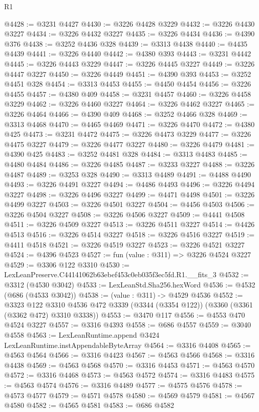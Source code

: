 \begin{lexlean}{R1}
\begin{coremodule}
@4428 := @3231 @4427
@4430 := @3226 @4428 @3229
@4432 := @3226 @4430 @3227
@4434 := @3226 @4432 @3227
@4435 := @3226 @4434
@4436 := @4390 @376
@4438 := @3252 @4436 @328
@4439 := @3313 @4438
@4440 := @4435 @4439
@4441 := @3226 @4440
@4442 := @4380 @393
@4443 := @3231 @4442
@4445 := @3226 @4443 @3229
@4447 := @3226 @4445 @3227
@4449 := @3226 @4447 @3227
@4450 := @3226 @4449
@4451 := @4390 @393
@4453 := @3252 @4451 @328
@4454 := @3313 @4453
@4455 := @4450 @4454
@4456 := @3226 @4455
@4457 := @4380 @409
@4458 := @3231 @4457
@4460 := @3226 @4458 @3229
@4462 := @3226 @4460 @3227
@4464 := @3226 @4462 @3227
@4465 := @3226 @4464
@4466 := @4390 @409
@4468 := @3252 @4466 @328
@4469 := @3313 @4468
@4470 := @4465 @4469
@4471 := @3226 @4470
@4472 := @4380 @425
@4473 := @3231 @4472
@4475 := @3226 @4473 @3229
@4477 := @3226 @4475 @3227
@4479 := @3226 @4477 @3227
@4480 := @3226 @4479
@4481 := @4390 @425
@4483 := @3252 @4481 @328
@4484 := @3313 @4483
@4485 := @4480 @4484
@4486 := @3226 @4485
@4487 := @3233 @3227
@4488 := @3226 @4487
@4489 := @3253 @328
@4490 := @3313 @4489
@4491 := @4488 @4490
@4493 := @3226 @4491 @3227
@4494 := @4486 @4493
@4496 := @3226 @4494 @3227
@4498 := @3226 @4496 @3227
@4499 := @4471 @4498
@4501 := @3226 @4499 @3227
@4503 := @3226 @4501 @3227
@4504 := @4456 @4503
@4506 := @3226 @4504 @3227
@4508 := @3226 @4506 @3227
@4509 := @4441 @4508
@4511 := @3226 @4509 @3227
@4513 := @3226 @4511 @3227
@4514 := @4426 @4513
@4516 := @3226 @4514 @3227
@4518 := @3226 @4516 @3227
@4519 := @4411 @4518
@4521 := @3226 @4519 @3227
@4523 := @3226 @4521 @3227
@4524 := @4396 @4523
@4527 := fun (value : @311) => @3226 @4524 @3227
@4529 := @3306 @122 @3310
@4530 := LexLeanPreserve.C44141062b63ebef453c0eb035f3ec5fd.R1.__fits_3
@4532 := @3312 (@4530 @3042)
@4533 := LexLeanStd.Sha256.hexWord
@4536 := @4532 (@686 (@4533 @3042))
@4538 := (value : @311) -> @4529 @4536
@4552 := @3323
    @122
    @3310
    @4536
    @472
    @3339
    (@3344 (@3354 @122))
    (@3360 (@3361 (@3362 @472) @3310 @3338))
@4553 := @3470 @117
@4556 := @4553 @470 @4524 @3227
@4557 := @3316 @4393
@4558 := @686 @4557
@4559 := @3040 @4558
@4563 := LexLeanRuntime.append @3424 LexLeanRuntime.instAppendableByteArray
@4564 := @3316 @4408
@4565 := @4563 @4564
@4566 := @3316 @4423
@4567 := @4563 @4566
@4568 := @3316 @4438
@4569 := @4563 @4568
@4570 := @3316 @4453
@4571 := @4563 @4570
@4572 := @3316 @4468
@4573 := @4563 @4572
@4574 := @3316 @4483
@4575 := @4563 @4574
@4576 := @3316 @4489
@4577 := @4575 @4576
@4578 := @4573 @4577
@4579 := @4571 @4578
@4580 := @4569 @4579
@4581 := @4567 @4580
@4582 := @4565 @4581
@4583 := @686 @4582

\end{coremodule}
\end{lexlean}
